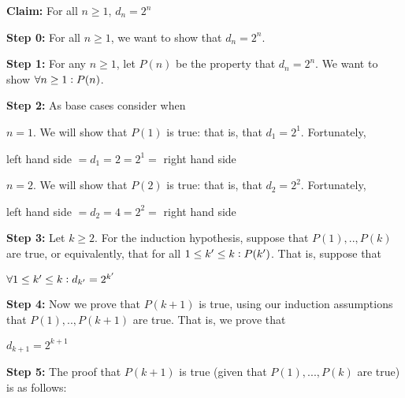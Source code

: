 \documentclass{article}
\begin{document}
\vspace{10pt}

\noindent\textbf{Claim:} For all $n\geq 1$, $d_n=2^n$\vspace{20pt}


\noindent\textbf{Step 0:} For all $n\geq 1$, we want to show that $d_n=2^n$.\vspace{15pt}

\noindent\textbf{Step 1:} For any $n\geq 1$, let $P(n)$ be the property that $d_n=2^n$. We want to show $\forall n\geq 1\vcentcolon P(n)$. \vspace{15pt}

\noindent\textbf{Step 2:} As base cases consider when\vspace{7pt}

$n=1$. We will show that $P(1)$ is true: that is, that $d_1=2^1$. Fortunately,

\begin{center}
	left hand side $=d_1=2=2^1=$ right hand side \\ 
\end{center}

$n=2$. We will show that $P(2)$ is true: that is, that $d_2=2^2$. Fortunately,

\begin{center}
	left hand side $=d_2=4=2^2=$ right hand side \\
\end{center}


\noindent\textbf{Step 3:} Let $k\geq 2$. For the induction hypothesis, suppose that $P(1),..,P(k)$ are true, or equivalently, that for all $1\leq k' \leq k\vcentcolon P(k')$. That is, suppose that 

\begin{center}
	$\forall 1\leq k'\leq k\vcentcolon d_{k'}=2^{k'}$
\end{center}
\vspace{15pt}


\noindent\textbf{Step 4:} Now we prove that $P(k+1)$ is true, using our induction assumptions that $P(1),..,P(k+1)$ are true. That is, we prove that
\begin{center}
	$d_{k+1}=2^{k+1}$ \\
\end{center}
\vspace{15pt}


\noindent\textbf{Step 5:} The proof that $P(k+1)$ is true (given that $P(1),...,P(k)$ are true) is as follows:
\vspace{5pt}
\end{document}
